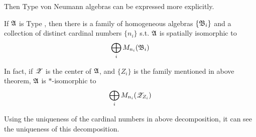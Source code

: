 Then Type  von Neumann algebras can be expressed more explicitly.
\begin{cor}
	If $\mathfrak{A}$ is Type , then there is a family of homogeneous algebras $\{\mathfrak{B}_i\}$ and a collection of distinct cardinal numbers $\{n_i\}$ s.t. $\mathfrak{A}$ is spatially isomorphic to
	\begin{equation*}
		\bigoplus_i M_{n_i}(\mathfrak{B}_i)
	\end{equation*}
\end{cor}

In fact, if $\mathscr{Z}$ is the center of $\mathfrak{A}$, and $\{Z_i\}$ is the family mentioned in above theorem, $\mathfrak{A}$ is $*$-isomorphic to 
\begin{equation*}
	\bigoplus_i M_{n_i}(\mathscr{Z}_{Z_i})
\end{equation*}
\begin{rem}
	Using the uniqueness of the cardinal numbers in above decomposition, it can see the uniqueness of this decomposition.
\end{rem}

